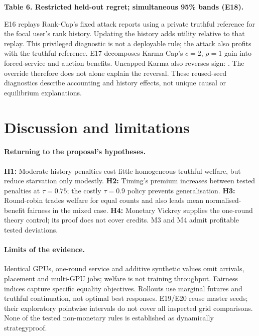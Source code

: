 \documentclass{article}
\newcommand{\resulttable}[1]{\begin{center}\small\setlength{\tabcolsep}{5pt}\end{center}}
\begin{document}
\begin{center}\small\textbf{Table 6. Restricted held-out regret; simultaneous 95\% bands (E18).}\end{center}
\resulttable{adaptive}

E16 replays Rank-Cap's fixed attack reports using a private truthful reference
for the focal user's rank history.
Updating the history adds \RankLedgerEffect{} utility relative to that replay.
This privileged diagnostic is not a deployable rule; the attack also profits
with the truthful reference. E17 decomposes Karma-Cap's $c=2$, $\rho=1$
gain into forced-service \KarmaForcedGain{} and auction \KarmaAuctionGain{}
benefits. Uncapped Karma also reverses sign: \KarmaUncappedReversal{}.
The override therefore does not alone explain the reversal. These reused-seed
diagnostics describe accounting and history effects, not unique causal or
equilibrium explanations.

\section{Discussion and limitations}
\paragraph{Returning to the proposal's hypotheses.}
\textbf{H1:} Moderate history penalties cost little homogeneous truthful welfare,
but reduce starvation only modestly. \textbf{H2:} Timing's premium increases
between tested penalties at $\tau=0.75$; the costly $\tau=0.9$ policy prevents
generalisation. \textbf{H3:} Round-robin trades welfare for equal counts and
also leads mean normalised-benefit fairness in the mixed case.
\textbf{H4:} Monetary Vickrey supplies the one-round theory control; its proof
does not cover credits. M3 and M4 admit profitable tested deviations.

\paragraph{Limits of the evidence.}
Identical GPUs, one-round service and additive synthetic values omit arrivals,
placement and multi-GPU jobs; welfare is not training throughput. Fairness
indices capture specific equality objectives. Rollouts use marginal futures
and truthful continuation, not optimal best responses. E19/E20 reuse master
seeds; their exploratory pointwise intervals do not cover all inspected grid
comparisons. None of the tested non-monetary rules is established as dynamically
strategyproof.
\end{document}

